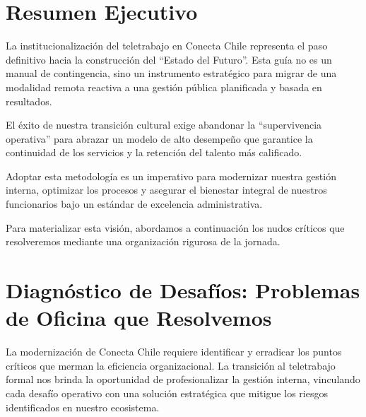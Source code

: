\documentclass[11pt,letterpaper]{article}
\begin{document}
\tableofcontents
\newpage

\section{Resumen Ejecutivo}

\begin{ExecutiveBox}
La institucionalización del teletrabajo en Conecta Chile representa el paso definitivo hacia la construcción del ``Estado del Futuro''. Esta guía no es un manual de contingencia, sino un instrumento estratégico para migrar de una modalidad remota reactiva a una gestión pública planificada y basada en resultados.

El éxito de nuestra transición cultural exige abandonar la ``supervivencia operativa'' para abrazar un modelo de alto desempeño que garantice la continuidad de los servicios y la retención del talento más calificado.

Adoptar esta metodología es un imperativo para modernizar nuestra gestión interna, optimizar los procesos y asegurar el bienestar integral de nuestros funcionarios bajo un estándar de excelencia administrativa.
\end{ExecutiveBox}

Para materializar esta visión, abordamos a continuación los nudos críticos que resolveremos mediante una organización rigurosa de la jornada.

\section{Diagnóstico de Desafíos: Problemas de Oficina que Resolvemos}

La modernización de Conecta Chile requiere identificar y erradicar los puntos críticos que merman la eficiencia organizacional. La transición al teletrabajo formal nos brinda la oportunidad de profesionalizar la gestión interna, vinculando cada desafío operativo con una solución estratégica que mitigue los riesgos identificados en nuestro ecosistema.
\end{document}
